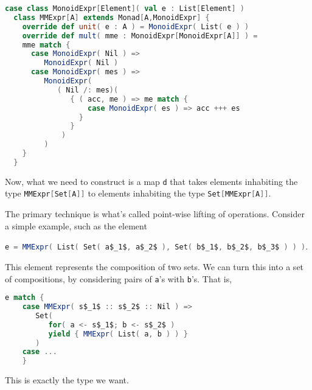 \break
\begin{lstlisting}[language=Scala]
  case class MonoidExpr[Element]( val e : List[Element] )
  class MMExpr[A] extends Monad[A,MonoidExpr] {
    override def unit( e : A ) = MonoidExpr( List( e ) )
    override def mult( mme : MonoidExpr[MonoidExpr[A]] ) =
    mme match {
      case MonoidExpr( Nil ) =>
         MonoidExpr( Nil )
      case MonoidExpr( mes ) => 
         MonoidExpr(
            ( Nil /: mes)( 
               { ( acc, me ) => me match { 
                   case MonoidExpr( es ) => acc +++ es 
                 } 
               } 
             )
         )
    }
  }
\end{lstlisting}

Now, what we need to construct is a map
\lstinline[language=Scala,mathescape=true]!d! that takes elements
inhabiting the type
\lstinline[language=Scala,mathescape=true]!MMExpr[Set[A]]! to elements
inhabiting the type
\lstinline[language=Scala,mathescape=true]!Set[MMExpr[A]]!.

The primary technique is what's called point-wise lifting of
operations. Consider a simple example, such as the element

\lstinline[language=Scala,mathescape=true]!e = MMExpr( List( Set( a$_1$, a$_2$ ), Set( b$_1$, b$_2$, b$_3$ ) ) )!.

This element represents the composition of two sets. We can turn this
into a set of compositions, by considering pairs of
\lstinline[language=Scala,mathescape=true]!a!'s with
\lstinline[language=Scala,mathescape=true]!b!'s. That is,

\begin{lstlisting}[language=Scala,mathescape=true]
  e match {
    case MMExpr( s$_1$ :: s$_2$ :: Nil ) => 
       Set(
          for( a <- s$_1$; b <- s$_2$ )
          yield { MMExpr( List( a, b ) ) }
       )
    case ...
    }
\end{lstlisting}

This is exactly the type we want.






